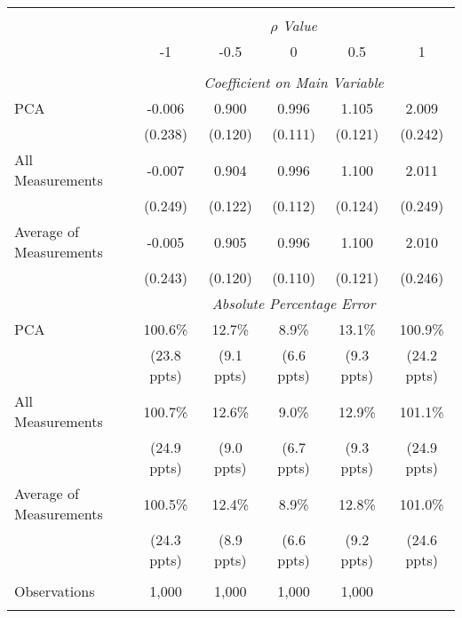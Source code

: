 \begin{table}[!htbp] \centering
\begin{tabular}{@{\extracolsep{5pt}}lccccc}
\\[-1.8ex]\hline
\hline \\[-1.8ex]
& \multicolumn{5}{c}{$\rho$ \textit{ Value}} \
\cr 
\\[-1.8ex] & -1 & -0.5 & 0 & 0.5 & 1 \\
\hline \\[-1.8ex]
& \multicolumn{5}{c}{\textit{Coefficient on Main Variable}} \\
 PCA & -0.006 & 0.900 & 0.996 & 1.105 & 2.009  \\
  & (0.238) & (0.120) & (0.111) & (0.121) & (0.242)\\
 All Measurements & -0.007 & 0.904 & 0.996 & 1.100 & 2.011  \\
  & (0.249) & (0.122) & (0.112) & (0.124) & (0.249)\\
 Average of Measurements & -0.005 & 0.905 & 0.996 & 1.100 & 2.010  \\
  & (0.243) & (0.120) & (0.110) & (0.121) & (0.246)\\
& \multicolumn{5}{c}{\textit{Absolute Percentage Error}} \\
  PCA & 100.6\% & 12.7\% & 8.9\% & 13.1\% & 100.9\% \\
   & (23.8 ppts) & (9.1 ppts) & (6.6 ppts) & (9.3 ppts) & (24.2 ppts)\\
All Measurements & 100.7\% & 12.6\% & 9.0\% & 12.9\% & 101.1\%  \\
  & (24.9 ppts) & (9.0 ppts) & (6.7 ppts) & (9.3 ppts) & (24.9 ppts)\\
  Average of Measurements & 100.5\% & 12.4\% & 8.9\% & 12.8\% & 101.0\% \\
  & (24.3 ppts) & (8.9 ppts) & (6.6 ppts) & (9.2 ppts) & (24.6 ppts)\\
  \hline \\[-1.8ex]
 Observations & 1,000 & 1,000 & 1,000 & 1,000 &\\
\hline
\hline \\[-1.8ex]
\end{tabular}
\end{table}